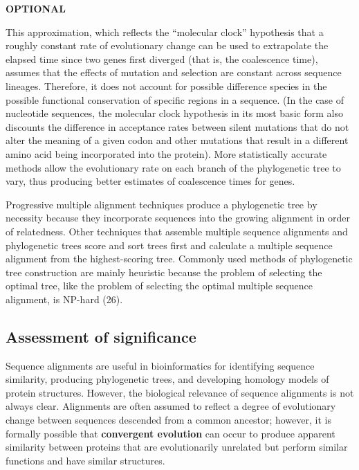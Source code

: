\documentclass[
]{book}
\begin{document}
\textbf{OPTIONAL}

This approximation, which reflects the ``molecular clock'' hypothesis that a roughly constant rate of evolutionary change can be used to extrapolate the elapsed time since two genes first diverged (that is, the coalescence time), assumes that the effects of mutation and selection are constant across sequence lineages. Therefore, it does not account for possible difference species in the possible functional conservation of specific regions in a sequence. (In the case of nucleotide sequences, the molecular clock hypothesis in its most basic form also discounts the difference in acceptance rates between silent mutations that do not alter the meaning of a given codon and other mutations that result in a different amino acid being incorporated into the protein). More statistically accurate methods allow the evolutionary rate on each branch of the phylogenetic tree to vary, thus producing better estimates of coalescence times for genes.

Progressive multiple alignment techniques produce a phylogenetic tree by necessity because they incorporate sequences into the growing alignment in order of relatedness. Other techniques that assemble multiple sequence alignments and phylogenetic trees score and sort trees first and calculate a multiple sequence alignment from the highest-scoring tree. Commonly used methods of phylogenetic tree construction are mainly heuristic because the problem of selecting the optimal tree, like the problem of selecting the optimal multiple sequence alignment, is NP-hard (26).

\hypertarget{assessment-of-significance}{%
\subsection{Assessment of significance}\label{assessment-of-significance}}

Sequence alignments are useful in bioinformatics for identifying sequence similarity, producing phylogenetic trees, and developing homology models of protein structures. However, the biological relevance of sequence alignments is not always clear. Alignments are often assumed to reflect a degree of evolutionary change between sequences descended from a common ancestor; however, it is formally possible that \textbf{convergent evolution} can occur to produce apparent similarity between proteins that are evolutionarily unrelated but perform similar functions and have similar structures.
\end{document}
